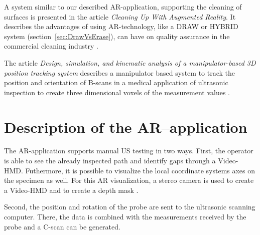 \documentclass{VRARWorkshop}
\begin{document}
A system similar to our described AR-application, supporting the cleaning of surfaces is presented in the article \textit{Cleaning Up With Augmented Reality}.
It describes the advantages of using AR-technology, like a DRAW or HYBRID system (section~\ref{sec:DrawVsErase}), can have on quality assurance in the commercial cleaning industry \cite{ARClean}.

The article \textit{Design, simulation, and kinematic analysis of a manipulator-based 3D position tracking system} describes a manipulator based system to track the position and orientation of B-scans in a medical application of ultrasonic inspection to create three dimensional voxels of the measurement values \cite{fadzil_design_2015}.

\section{Description of the AR--application}
The AR-application supports manual US testing in two ways.
First, the operator is able to see the already inspected path and identify gaps through a {\sc Video-HMD}.
Futhermore, it is possible to visualize the local coordinate systems axes on the specimen as well.
For this AR visualization, a stereo camera is used to create a {\sc Video-HMD} and to create a depth mask \cite{dorner_virtual_2013}. 

Second, the position and rotation of the probe are sent to the ultrasonic scanning computer.
There, the data is combined with the measurements received by the probe and a C-scan can be generated.
\end{document}
